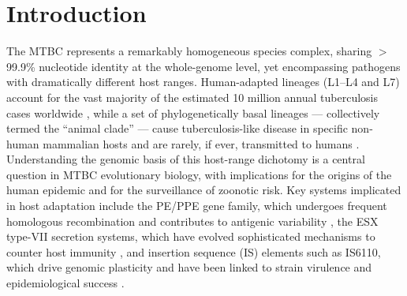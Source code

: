 \documentclass[11pt,a4paper]{article}
\newcommand{\MTBC}{MTBC}
\begin{document}
\begin{abstract}
enriched for polyketide synthase genes.
%
Phylogenetic clade signature analysis identifies 10~synapomorphic SPDIs
defining the grand clade (L5~+ both animal clades~+ L6/L9/L10), including
functionally impactful frameshifts in \textit{ald} (L-alanine dehydrogenase)
and \textit{cyp142} (cholesterol-metabolising cytochrome~P450).
%
Twelve additional synapomorphies define the clade~2\,+\,L6/L9/L10 node
(including \textit{eccB3} in ESX-3 and \textit{plsB2} in lipid biosynthesis),
while only 4~SPDIs are truly exclusive to L6/L9/L10, suggesting that
secondary human re-adaptation required minimal genomic innovation.
Comparison with the second animal clade (clade~1: Bovis/Caprae/Orygis/La4/Microti/Pinnipedii;
$n = 529$; 427~core SPDIs, 2~truly exclusive) reveals zero shared IS activity
(0.0\% vs 2.1\%) but striking pathway-level convergence: 33 of 40~clade~1
convergent genes (82.5\%) are also convergent in clade~2, predominantly in
PKS/PDIM and signal transduction pathways.
%
Notably, no synapomorphic variants could be identified for the strict
human clade (L1--L4--L7), reflecting the reference bias inherent to SNP
calling against the L4-derived H37Rv genome.
%
These results delineate the genomic boundaries between animal and human MTBC
ecotypes and highlight the PKS/PDIM pathway as a key determinant of host range.

\noindent\textbf{Keywords:} \textit{Mycobacterium tuberculosis} complex, animal-adapted
lineages, comparative genomics, PDIM, PE/PPE, ESX, convergent evolution, host adaptation.
\end{abstract}

\section{Introduction}
\label{sec:intro}

The \MTBC{} represents a remarkably homogeneous species complex, sharing
$>$99.9\% nucleotide identity at the whole-genome level, yet encompassing
pathogens with dramatically different host ranges.
%
Human-adapted lineages (L1--L4 and L7) account for the vast majority of the
estimated 10 million annual tuberculosis cases worldwide \cite{WHO2023}, while a
set of phylogenetically basal lineages --- collectively termed the ``animal
clade'' --- cause tuberculosis-like disease in specific non-human mammalian hosts
and are rarely, if ever, transmitted to humans \cite{Boritsch2016, Gagneux2025}.
%
Understanding the genomic basis of this host-range dichotomy is a central
question in MTBC evolutionary biology, with implications for the origins of the
human epidemic and for the surveillance of zoonotic risk. Key systems implicated
in host adaptation include the PE/PPE gene family, which undergoes frequent
homologous recombination and contributes to antigenic variability
\cite{Karboul2008}, the ESX type-VII secretion systems, which have evolved
sophisticated mechanisms to counter host immunity \cite{Groschel2016}, and
insertion sequence (IS) elements such as IS6110, which drive genomic plasticity
and have been linked to strain virulence and epidemiological success
\cite{Fallow2010}.
\end{document}
